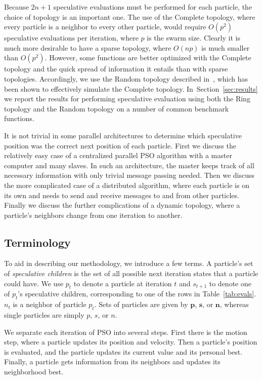 \documentclass[journal,letterpaper]{IEEEtran}
\renewcommand{\sec}[1]{Section~\ref{sec:#1}}
\providecommand{\p}{\ensuremath{p}}
\providecommand{\pset}{\ensuremath{\mathbf{p}}}
\providecommand{\s}{\ensuremath{s}}
\providecommand{\sset}{\ensuremath{\mathbf{s}}}
\providecommand{\n}{\ensuremath{n}}
\providecommand{\nset}{\ensuremath{\mathbf{n}}}
\begin{document}
Because $2n+1$ speculative evaluations must be performed for each particle, the
choice of topology is an important one.  The use of the Complete topology,
where every particle is a neighbor to every other particle, would require
$O(p^2)$ speculative evaluations per iteration, where $p$ is the swarm size.
Clearly it is much more desirable to have a sparse topology, where $O(np)$ is
much smaller than $O(p^2)$.  However, some functions are better optimized with
the Complete topology and the quick spread of information it entails than with
sparse topologies.  Accordingly, we use the Random topology described
in~\cite{mcnabb-cec09}, which has been shown to effectively simulate the
Complete topology.  In~\sec{results} we report the results for performing
speculative evaluation using both the Ring topology and the Random topology on
a number of common benchmark functions.

It is not trivial in some parallel architectures to determine which speculative
position was the correct next position of each particle.  First we discuss the
relatively easy case of a centralized parallel PSO algorithm with a master
computer and many slaves.  In such an architecture, the master keeps track of
all necessary information with only trivial message passing needed.  Then we
discuss the more complicated case of a distributed algorithm, where each
particle is on its own and needs to send and receive messages to and from other
particles.  Finally we discuss the further complications of a dynamic topology,
where a particle's neighbors change from one iteration to another.

\subsection{Terminology}

To aid in describing our methodology, we introduce a few terms.  A particle's
set of \emph{speculative children} is the set of all possible next iteration
states that a particle could have.  We use $\p_t$ to denote a particle at
iteration $t$ and $\s_{t+1}$ to denote one of $\p_t$'s speculative children,
corresponding to one of the rows in Table~\ref{tab:evals}.  $\n_t$ is a
neighbor of particle $\p_t$.  Sets of particles are given by $\pset$, $\sset$,
or $\nset$, whereas single particles are simply $\p$, $\s$, or $\n$.

We separate each iteration of PSO into several steps.  First there is the
motion step, where a particle updates its position and velocity.  Then a
particle's position is evaluated, and the particle updates its current value
and its personal best.  Finally, a particle gets information from its neighbors
and updates its neighborhood best.
\end{document}
